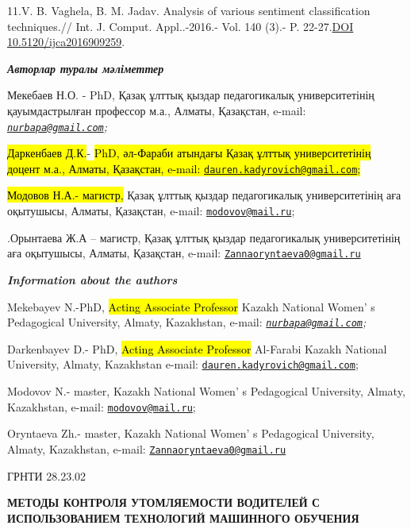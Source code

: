 11.V. B. Vaghela, B. M. Jadav. Analysis of various sentiment
classification techniques.// Int. J. Comput. Appl..-2016.- Vol. 140
(3).- P. 22-27.\href{https://doi.org/10.5120/ijca2016909259}{DOI
10.5120/ijca2016909259}.

\emph{{\bfseries Авторлар туралы мәліметтер}}

Мекебаев Н.О. - PhD, Қазақ ұлттық қыздар педагогикалық университетінің
қауымдастрылған профессор м.а., Алматы, Қазақстан, e-mail:
\emph{\href{mailto:nurbapa@gmail.com}{\nolinkurl{nurbapa@gmail.com}};}

\hl{Даркенбаев Д.К.}- \hl{PhD, әл-Фараби атындағы Қазақ ұлттық
университетінің доцент м.а., Алматы, Қазақстан, e-mail:
\href{mailto:dauren.kadyrovich@gmail.com}{\nolinkurl{dauren.kadyrovich@gmail.com}};}

\hl{Модовов Н.А.- магистр,} Қазақ ұлттық қыздар педагогикалық
университетінің аға оқытушысы, Алматы, Қазақстан, e-mail:
\href{mailto:modovov@mail.ru}{\nolinkurl{modovov@mail.ru}};

.Орынтаева Ж.А -- магистр, Қазақ ұлттық қыздар педагогикалық
университетінің аға оқытушысы, Алматы, Қазақстан, e-mail:
\href{mailto:Zannaoryntaeva0@gmail.ru}{\nolinkurl{Zannaoryntaeva0@gmail.ru}}

\emph{{\bfseries Information about the authors}}

Mekebayev N.-PhD, \hl{Acting Associate Professor} Kazakh National
Women' s Pedagogical University, Almaty, Kazakhstan,
e-mail:
\emph{\href{mailto:nurbapa@gmail.com}{\nolinkurl{nurbapa@gmail.com}};}

Darkenbayev D.- PhD, \hl{Acting Associate Professor} Al-Farabi Kazakh
National University, Almaty, Kazakhstan e-mail:
\href{mailto:dauren.kadyrovich@gmail.com}{\nolinkurl{dauren.kadyrovich@gmail.com}};

Modovov N.- master, Kazakh National Women' s Pedagogical
University, Almaty, Kazakhstan, e-mail:
\href{mailto:modovov@mail.ru}{\nolinkurl{modovov@mail.ru}};

Oryntaeva Zh.- master, Kazakh National Women' s
Pedagogical University, Almaty, Kazakhstan, e-mail:
\href{mailto:Zannaoryntaeva0@gmail.ru}{\nolinkurl{Zannaoryntaeva0@gmail.ru}}

ГРНТИ 28.23.02

{\bfseries МЕТОДЫ КОНТРОЛЯ УТОМЛЯЕМОСТИ ВОДИТЕЛЕЙ С ИСПОЛЬЗОВАНИЕМ
ТЕХНОЛОГИЙ МАШИННОГО ОБУЧЕНИЯ}

